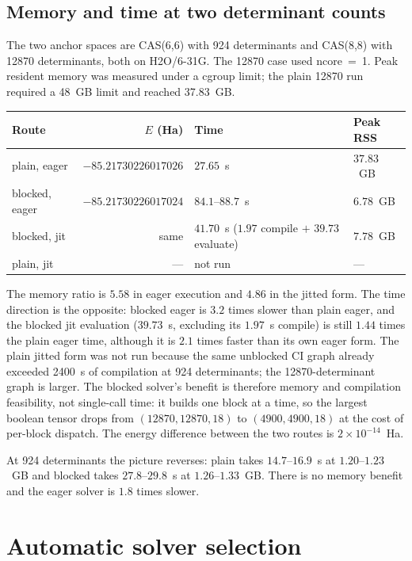 \subsection{Memory and time at two determinant counts}

The two anchor spaces are CAS(6,6) with 924 determinants and CAS(8,8)
with 12870 determinants, both on H2O/6-31G.  The 12870 case used
ncore~=~1.  Peak resident memory was measured under a cgroup limit; the
plain 12870 run required a 48~GB limit and reached 37.83~GB.

\begin{center}
\begin{tabular}{lrll}
\toprule
Route & $E$ (Ha) & Time & Peak RSS \\
\midrule
plain, eager & $-85.21730226017026$ & $27.65$~s & $37.83$~GB \\
blocked, eager & $-85.21730226017024$ & $84.1$--$88.7$~s & $6.78$~GB \\
blocked, jit & same & $41.70$~s ($1.97$ compile $+$ $39.73$ evaluate)
  & $7.78$~GB \\
plain, jit & --- & not run & --- \\
\bottomrule
\end{tabular}
\end{center}

The memory ratio is $5.58$ in eager execution and $4.86$ in the jitted
form.  The time direction is the opposite: blocked eager is $3.2$
times slower than plain eager, and the blocked jit evaluation
($39.73$~s, excluding its $1.97$~s compile) is still $1.44$ times the
plain eager time, although it is $2.1$ times faster than its own eager
form.  The plain jitted form was not run because the same
unblocked CI graph already exceeded 2400~s of compilation at 924
determinants; the 12870-determinant graph is larger.  The blocked
solver's benefit is therefore memory and compilation feasibility, not
single-call time: it builds one block at a time, so the largest boolean
tensor drops from $(12870, 12870, 18)$ to $(4900, 4900, 18)$ at the cost
of per-block dispatch.  The energy difference between the two routes
is $2\times10^{-14}$~Ha.

At 924 determinants the picture reverses: plain takes
$14.7$--$16.9$~s at $1.20$--$1.23$~GB and blocked takes
$27.8$--$29.8$~s at $1.26$--$1.33$~GB.  There is no memory benefit and
the eager solver is $1.8$ times slower.

\section{Automatic solver selection}

